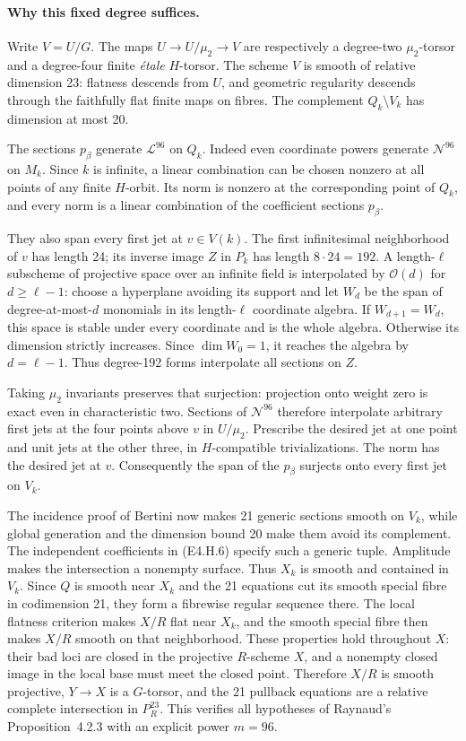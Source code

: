 \paragraph{Why this fixed degree suffices.}
Write $V=U/G$. The maps $U\to U/\mu_2\to V$ are respectively a degree-two
$\mu_2$-torsor and a degree-four finite \emph{\'etale} $H$-torsor.
The scheme $V$ is smooth of relative dimension 23: flatness descends
from $U$, and geometric regularity descends through the faithfully flat
finite maps on fibres. The complement $Q_k\setminus V_k$ has dimension
at most 20.

The sections $p_\beta$ generate $\mathcal L^{96}$ on $Q_k$. Indeed even
coordinate powers generate $\mathcal N^{96}$ on $M_k$. Since $k$ is
infinite, a linear combination can be chosen nonzero at all points of
any finite $H$-orbit. Its norm is nonzero at the corresponding point of
$Q_k$, and every norm is a linear combination of the coefficient
sections $p_\beta$.

They also span every first jet at $v\in V(k)$. The first infinitesimal
neighborhood of $v$ has length 24; its inverse image $Z$ in $P_k$ has
length $8\cdot24=192$. A length-$\ell$ subscheme of projective space
over an infinite field is interpolated by $\mathcal O(d)$ for
$d\geq\ell-1$: choose a hyperplane avoiding its support and let $W_d$
be the span of degree-at-most-$d$ monomials in its length-$\ell$
coordinate algebra. If $W_{d+1}=W_d$, this space is stable under every
coordinate and is the whole algebra. Otherwise its dimension strictly
increases. Since $\dim W_0=1$, it reaches the algebra by $d=\ell-1$.
Thus degree-192 forms interpolate all sections on $Z$.

Taking $\mu_2$ invariants preserves that surjection: projection onto
weight zero is exact even in characteristic two. Sections of
$\mathcal N^{96}$ therefore interpolate arbitrary first jets at the
four points above $v$ in $U/\mu_2$. Prescribe the desired jet at one
point and unit jets at the other three, in $H$-compatible
trivializations. The norm has the desired jet at $v$. Consequently
the span of the $p_\beta$ surjects onto every first jet on $V_k$.

The incidence proof of Bertini now makes 21 generic sections smooth on
$V_k$, while global generation and the dimension bound 20 make them
avoid its complement. The independent coefficients in (E4.H.6) specify
such a generic tuple. Amplitude makes the intersection a nonempty
surface. Thus $X_k$ is smooth and contained in $V_k$. Since $Q$ is smooth
near $X_k$ and the 21 equations cut its smooth special fibre in codimension
21, they form a fibrewise regular sequence there. The local flatness
criterion makes $X/R$ flat near $X_k$, and the smooth special fibre then
makes $X/R$ smooth on that neighborhood. These properties hold throughout
$X$: their bad loci are closed in the projective
$R$-scheme $X$, and a nonempty closed image in the local base must meet
the closed point. Therefore $X/R$ is smooth projective, $Y\to X$ is a
$G$-torsor, and the 21 pullback equations are a relative complete
intersection in $P^{23}_R$. This verifies all hypotheses of Raynaud's
Proposition~4.2.3 with an explicit power $m=96$.


